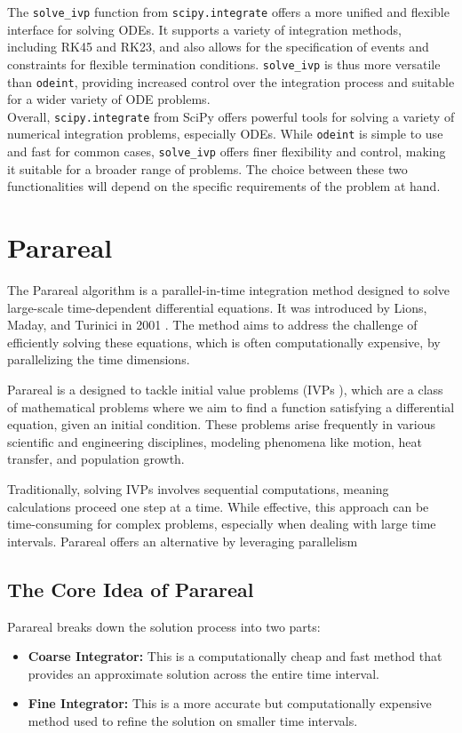 \documentclass[a4paper,12pt,french]{article}
\begin{document}
The \texttt{solve\_ivp} function from \texttt{scipy.integrate} offers a more unified and flexible interface for solving ODEs. It supports a variety of integration methods, including RK45 and RK23, and also allows for the specification of events and constraints for flexible termination conditions. \texttt{solve\_ivp} is thus more versatile than \texttt{odeint}, providing increased control over the integration process and suitable for a wider variety of ODE problems.\\

Overall, \texttt{scipy.integrate} from SciPy offers powerful tools for solving a variety of numerical integration problems, especially ODEs. While \texttt{odeint} is simple to use and fast for common cases, \texttt{solve\_ivp} offers finer flexibility and control, making it suitable for a broader range of problems. The choice between these two functionalities will depend on the specific requirements of the problem at hand.

\section{Parareal}
The Parareal algorithm is a parallel-in-time integration method designed to solve large-scale time-dependent differential equations. It was introduced by Lions, Maday, and Turinici in 2001 \cite{lions2001resolution}. The method aims to address the challenge of efficiently solving these equations, which is often computationally expensive, by parallelizing the time dimensions.

Parareal is a  designed to tackle initial value problems (IVPs \cite{shampine2000initial}), which are a class of mathematical problems where we aim to find a function satisfying a differential equation, given an initial condition. These problems arise frequently in various scientific and engineering disciplines, modeling phenomena like motion, heat transfer, and population growth.

Traditionally, solving IVPs involves sequential computations, meaning calculations proceed one step at a time. While effective, this approach can be time-consuming for complex problems, especially when dealing with large time intervals. Parareal offers an alternative by leveraging parallelism

\subsection{The Core Idea of Parareal}
Parareal breaks down the solution process into two parts:
\begin{itemize}
    \item \textbf{Coarse Integrator:} This is a computationally cheap and fast method that provides an approximate solution across the entire time interval.
    \item \textbf{Fine Integrator:} This is a more accurate but computationally expensive method used to refine the solution on smaller time intervals.
\end{itemize}
\end{document}

